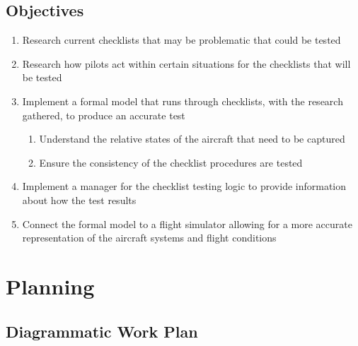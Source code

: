 \documentclass[a4paper, british]{article}
\begin{document}
\newpage
\subsection*{Objectives}
\begin{enumerate}
  \item Research current checklists that may be problematic that 
    could be tested
  \item Research how pilots act within certain situations for 
    the checklists that will be tested
  \item Implement a formal model that runs through checklists,
    with the research gathered, to produce an accurate test
    \begin{enumerate}
      \item Understand the relative states of the aircraft that 
        need to be captured
      \item Ensure the consistency of the checklist procedures 
        are tested
    \end{enumerate}
  \item Implement a manager for the checklist testing logic to 
    provide information about how the test results
  \item Connect the formal model to a flight simulator allowing
    for a more accurate representation of the aircraft systems
    and flight conditions
\end{enumerate}

\section{Planning}
\subsection{Diagrammatic Work Plan}

\end{document}
